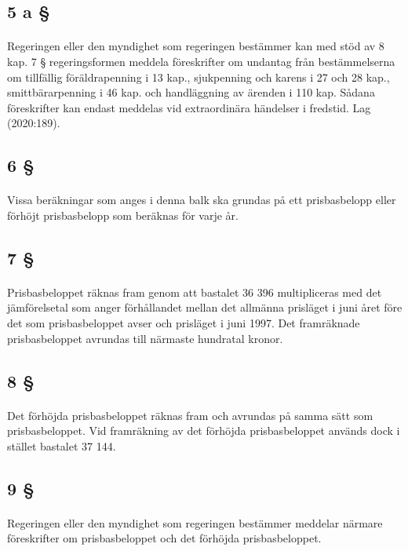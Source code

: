 \documentclass[a4paper,notitlepage,openany,10pt]{book}
\begin{document}
\subsection*{5 a §}
\paragraph*{}
Regeringen eller den myndighet som regeringen bestämmer kan med stöd av 8 kap. 7 § regeringsformen meddela föreskrifter om undantag från bestämmelserna om tillfällig föräldrapenning i 13 kap., sjukpenning och karens i 27 och 28 kap., smittbärarpenning i 46 kap. och handläggning av ärenden i 110 kap. Sådana föreskrifter kan endast meddelas vid extraordinära händelser i fredstid.
Lag (2020:189).
\subsection*{6 §}
\paragraph*{}
Vissa beräkningar som anges i denna balk ska grundas på ett prisbasbelopp eller förhöjt prisbasbelopp som beräknas för varje år.
\subsection*{7 §}
\paragraph*{}
Prisbasbeloppet räknas fram genom att bastalet 36 396 multipliceras med det jämförelsetal som anger förhållandet mellan det allmänna prisläget i juni året före det som prisbasbeloppet avser och prisläget i juni 1997. Det framräknade prisbasbeloppet avrundas till närmaste hundratal kronor.
\subsection*{8 §}
\paragraph*{}
Det förhöjda prisbasbeloppet räknas fram och avrundas på samma sätt som prisbasbeloppet. Vid framräkning av det förhöjda prisbasbeloppet används dock i stället bastalet 37 144.
\subsection*{9 §}
\paragraph*{}
Regeringen eller den myndighet som regeringen bestämmer meddelar närmare föreskrifter om prisbasbeloppet och det förhöjda prisbasbeloppet.
\end{document}
